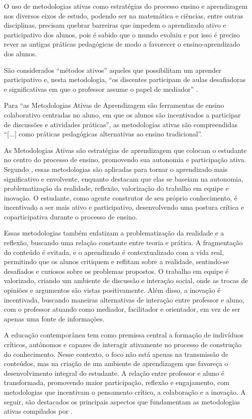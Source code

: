 O uso de metodologias ativas como estratégias do processo ensino e aprendizagem nos diversos eixos de estudo, podendo ser na matemática e ciências, entre outras disciplinas, precisam quebrar barreiras que impedem o aprendizado ativo e participativo dos alunos, pois é sabido que o mundo evoluiu e por isso é preciso rever as antigas práticas pedagógicas de modo a favorecer o ensino-aprendizado dos alunos.

São considerados ``métodos ativos'' aqueles que possibilitam um aprender participativo e, nesta metodologia, ``os discentes participam de aulas desafiadoras e significativas em que o professor assume o papel de mediador'' \cite[p. 56]{GOUVEIA2019}.

Para  ``as Metodologias Ativas de Aprendizagem são ferramentas de ensino colaborativo centradas no aluno, em que os alunos são incentivados a participar de discussões e atividades práticas'', as metodologias ativas são compreendidas ``[...] como práticas pedagógicas alternativas ao ensino tradicional''.

As Metodologias Ativas são estratégias de aprendizagem que colocam o estudante no centro do processo de ensino, promovendo sua autonomia e participação ativa. Segundo , essas metodologias são aplicadas para tornar o aprendizado mais significativo e envolvente, enquanto  destacam que elas se baseiam na autonomia, problematização da realidade, reflexão, valorização do trabalho em equipe e inovação. O estudante, como agente construtor de seu próprio conhecimento, é incentivado a ser mais ativo e participativo, desenvolvendo uma postura crítica e coparticipativa durante o processo de ensino.

Essas metodologias também enfatizam a problematização da realidade e a reflexão, buscando uma relação constante entre teoria e prática. A fragmentação do conteúdo é evitada, e o aprendizado é contextualizado com a vida real, permitindo que os alunos critiquem e reflitam sobre a realidade, sentindo-se desafiados e curiosos sobre os problemas propostos. O trabalho em equipe é valorizado, criando um ambiente de discussão e interação social, onde as trocas de opiniões e argumentos são vistas positivamente. Além disso, a inovação é incentivada, buscando maneiras alternativas de interação entre professor e aluno, com o professor atuando como mediador, facilitador e orientador, em vez de ser apenas uma fonte de informações.

A educação contemporânea tem como premissa central a formação de indivíduos críticos, autônomos e capazes de interagir ativamente no processo de construção do conhecimento. Nesse contexto, o foco não está apenas na transmissão de conteúdos, mas na criação de um ambiente de aprendizagem que favoreça o desenvolvimento integral do estudante. A relação entre professor e aluno é transformada, promovendo maior participação, reflexão e engajamento, com metodologias que incentivam o pensamento crítico, a colaboração e a inovação. A seguir, são destacados os principais aspectos que fundamentam as metodologias ativas compilados por .

